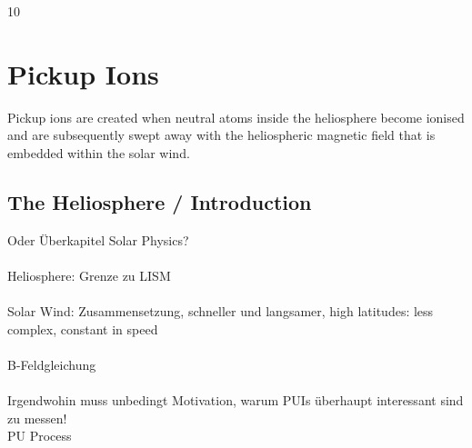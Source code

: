 10%

\chapter{Pickup Ions} %

\label{chapter:theory} %





Pickup ions are created when neutral atoms inside the heliosphere become ionised and are subsequently swept away with the heliospheric magnetic field that is embedded within the solar wind.


\section{The Heliosphere / Introduction}

Oder Überkapitel Solar Physics?
\\ \\
Heliosphere: Grenze zu LISM
\\ \\
Solar Wind: Zusammensetzung, schneller und langsamer, high latitudes: less complex, constant in speed \\ \\
B-Feldgleichung
\\ \\
Irgendwohin muss unbedingt Motivation, warum PUIs überhaupt interessant sind zu messen!
\\
PU Process

